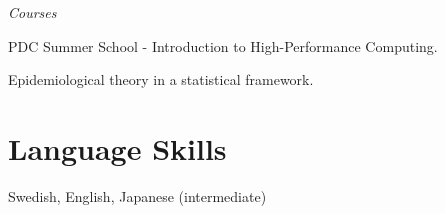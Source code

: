 \halfblankline

\textit{Courses}
\begin{innerlist}
    \item PDC Summer School - Introduction to High-Performance Computing.
    \item Epidemiological theory in a statistical framework.
\end{innerlist}


%
%
\section{Language Skills}
Swedish, English, Japanese (intermediate)
